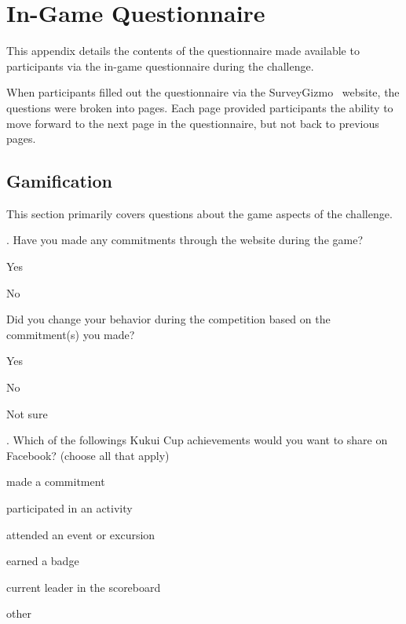 \chapter{In-Game Questionnaire}
\label{app:in-game-questionnaire}

This appendix details the contents of the questionnaire made available to participants via the in-game questionnaire during the challenge.

When participants filled out the questionnaire via the SurveyGizmo~\cite{surveygizmo} website, the questions were broken into pages. Each page provided participants the ability to move forward to the next page in the questionnaire, but not back to previous pages. 

\section{Gamification}

This section primarily covers questions about the game aspects of the challenge.

\vspace{5 mm}
. Have you made any commitments through the website during the game?

\begin{radiobutton}
	\item Yes
	\item No
\end{radiobutton}

\noindent
[If Yes] Did you change your behavior during the competition based on the commitment(s) you made?

\begin{radiobutton}
	\item Yes
	\item No
	\item Not sure
\end{radiobutton}

\vspace{5 mm}
. Which of the followings Kukui Cup achievements would you want to share on Facebook? (choose all that apply)

\begin{checkbox}
	\item made a commitment
	\item participated in an activity
	\item attended an event or excursion
	\item earned a badge
	\item current leader in the scoreboard
	\item other
\end{checkbox}

